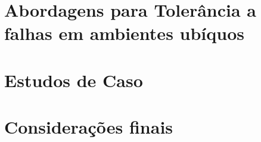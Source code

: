 \documentclass{SBCbookchapter}
\begin{document}
\section{Abordagens para Tolerância a falhas em ambientes ubíquos}
\label{sec:tolerancia}


\section{Estudos de Caso}
\label{sec:estudos}


\section{Considerações finais}
\label{sec:conclusoes}


	



\end{document}
